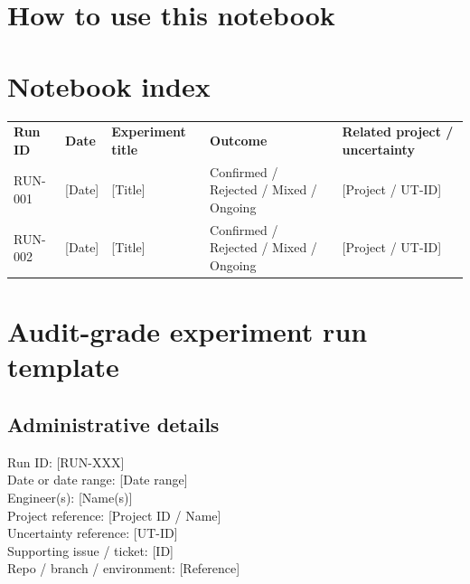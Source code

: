 \documentclass[11pt]{article}
\begin{document}
\RDTitlePage
\tableofcontents
\clearpage

\section{How to use this notebook}


\section{Notebook index}
\begin{xltabular}{\textwidth}{L{2.4cm}L{2.3cm}L{4.4cm}L{2.8cm}Y}
\textbf{Run ID} & \textbf{Date} & \textbf{Experiment title} & \textbf{Outcome} & \textbf{Related project / uncertainty} \\
RUN-001 & {[Date]} & {[Title]} & {Confirmed / Rejected / Mixed / Ongoing} & {[Project / UT-ID]} \\
RUN-002 & {[Date]} & {[Title]} & {Confirmed / Rejected / Mixed / Ongoing} & {[Project / UT-ID]} \\
\end{xltabular}

\section{Audit-grade experiment run template}
\subsection{Administrative details}
Run ID: {[RUN-XXX]}\\
Date or date range: {[Date range]}\\
Engineer(s): {[Name(s)]}\\
Project reference: {[Project ID / Name]}\\
Uncertainty reference: {[UT-ID]}\\
Supporting issue / ticket: {[ID]}\\
Repo / branch / environment: {[Reference]}
\end{document}
